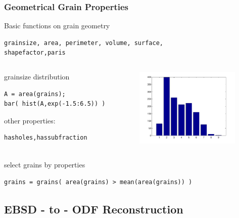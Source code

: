 \begin{frame}[fragile]
  \frametitle{Geometrical Grain Properties}

Basic functions on grain geometry
\begin{lstlisting}
grainsize, area, perimeter, volume, surface,
shapefactor,paris
\end{lstlisting}

\begin{columns}[t]
  \begin{column}[T]{6.5cm}

\medskip

  grainsize distribution
\begin{lstlisting}
A = area(grains);
bar( hist(A,exp(-1.5:6.5)) )
\end{lstlisting}

\medskip

other properties:
\begin{lstlisting}[basicstyle=\footnotesize]
hasholes,hassubfraction
\end{lstlisting}

	\end{column}
	\begin{column}[T]{5cm}
		\includegraphics[width=5cm]{pic/grh}
	\end{column}
\end{columns}

select grains by properties
\begin{lstlisting}
grains = grains( area(grains) > mean(area(grains)) )
\end{lstlisting}

\end{frame}


%



\subsection*{EBSD - to - ODF Reconstruction}


